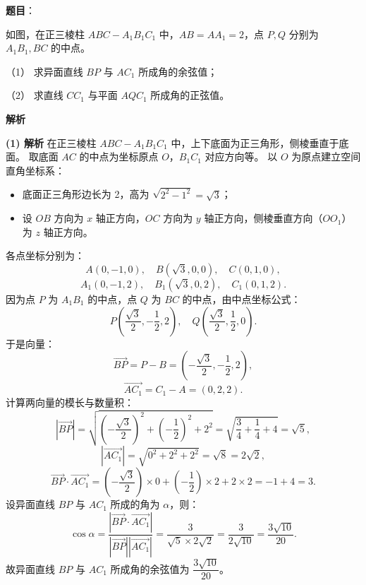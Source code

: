 \begin{answer}

\textbf{题目}：

如图，在正三棱柱 $ABC - A_1B_1C_1$ 中，$AB = AA_1 = 2$，点 $P, Q$ 分别为 $A_1B_1, BC$ 的中点。

（1） 求异面直线 $BP$ 与 $AC_1$ 所成角的余弦值；

（2） 求直线 $CC_1$ 与平面 $AQC_1$ 所成角的正弦值。
\nopagebreak[4]
\begin{center}\end{center}
\nopagebreak[4]
\textbf{解析}

\textbf{(1) 解析}
在正三棱柱 $ABC - A_1B_1C_1$ 中，上下底面为正三角形，侧棱垂直于底面。
取底面 $AC$ 的中点为坐标原点 $O$，$B_1C_1$ 对应方向等。
以 $O$ 为原点建立空间直角坐标系：
\begin{itemize}
\item 底面正三角形边长为 2，高为 $\sqrt{2^2 - 1^2} = \sqrt{3}$；
\item 设 $OB$ 方向为 $x$ 轴正方向，$OC$ 方向为 $y$ 轴正方向，侧棱垂直方向（$OO_1$）为 $z$ 轴正方向。
\end{itemize}
各点坐标分别为：
\nopagebreak[4]
\[A(0, -1, 0), \quad B(\sqrt{3}, 0, 0), \quad C(0, 1, 0),\]
\nopagebreak[4]
\[A_1(0, -1, 2), \quad B_1(\sqrt{3}, 0, 2), \quad C_1(0, 1, 2).\]
因为点 $P$ 为 $A_1B_1$ 的中点，点 $Q$ 为 $BC$ 的中点，由中点坐标公式：
\nopagebreak[4]
\[P\left(\frac{\sqrt{3}}{2}, -\frac{1}{2}, 2\right), \quad Q\left(\frac{\sqrt{3}}{2}, \frac{1}{2}, 0\right).\]
于是向量：
\nopagebreak[4]
\[\overrightarrow{BP} = P - B = \left(-\frac{\sqrt{3}}{2}, -\frac{1}{2}, 2\right),\]
\nopagebreak[4]
\[\overrightarrow{AC_1} = C_1 - A = (0, 2, 2).\]
计算两向量的模长与数量积：
\nopagebreak[4]
\[|\overrightarrow{BP}| = \sqrt{\left(-\frac{\sqrt{3}}{2}\right)^2 + \left(-\frac{1}{2}\right)^2 + 2^2} = \sqrt{\frac{3}{4} + \frac{1}{4} + 4} = \sqrt{5},\]
\nopagebreak[4]
\[|\overrightarrow{AC_1}| = \sqrt{0^2 + 2^2 + 2^2} = \sqrt{8} = 2\sqrt{2},\]
\nopagebreak[4]
\[\overrightarrow{BP} \cdot \overrightarrow{AC_1} = \left(-\frac{\sqrt{3}}{2}\right) \times 0 + \left(-\frac{1}{2}\right) \times 2 + 2 \times 2 = -1 + 4 = 3.\]
设异面直线 $BP$ 与 $AC_1$ 所成的角为 $\alpha$，则：
\nopagebreak[4]
\[\cos\alpha = \frac{|\overrightarrow{BP} \cdot \overrightarrow{AC_1}|}{|\overrightarrow{BP}| |\overrightarrow{AC_1}|} = \frac{3}{\sqrt{5} \times 2\sqrt{2}} = \frac{3}{2\sqrt{10}} = \frac{3\sqrt{10}}{20}.\]
故异面直线 $BP$ 与 $AC_1$ 所成角的余弦值为 $\dfrac{3\sqrt{10}}{20}$。


\end{answer}
